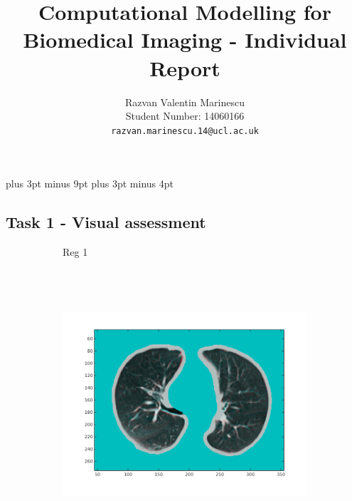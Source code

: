 \documentclass[11pt,a4paper,oneside]{report}
\title{Computational Modelling for Biomedical Imaging - Individual Report}
\author{
Razvan Valentin Marinescu\\
Student Number: 14060166\\
\texttt{razvan.marinescu.14@ucl.ac.uk}
}
\begin{document}
\belowdisplayskip=12pt plus 3pt minus 9pt
\belowdisplayshortskip=7pt plus 3pt minus 4pt
\maketitle{}




\subsection*{Task 1 - Visual assessment}

\begin{figure}[H]
        \centering
        \begin{subfigure}[b]{0.1\textwidth}
          Reg 1\\\\\\\\
        \end{subfigure}%
        \hspace*{-1.9em}
        \begin{subfigure}[b]{0.3\textwidth}
                \includegraphics[width=\textwidth, trim=20 20 20 20]{figures/reg1/reg1_1_66.png}
        \end{subfigure}%
        \begin{subfigure}[b]{0.3\textwidth}

\end{subfigure}
\end{figure}
\end{document}
